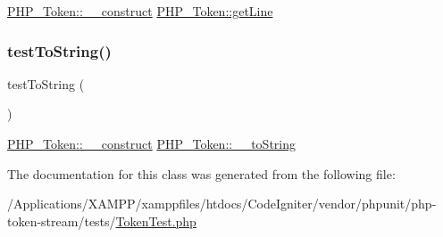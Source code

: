 \mbox{\hyperlink{class_p_h_p___token_a964082b4a027ef6b5e11976d90cf21b6}{P\+H\+P\+\_\+\+Token\+::\+\_\+\+\_\+construct}}  \mbox{\hyperlink{class_p_h_p___token_aef9c32f6066788a101028a1d4150f8cb}{P\+H\+P\+\_\+\+Token\+::get\+Line}} \mbox{\label{class_p_h_p___token_test_ad0c45cf7077d1d6d8627e47de00e0374}} 
\subsubsection{\texorpdfstring{test\+To\+String()}{testToString()}}
{\footnotesize\ttfamily test\+To\+String (\begin{DoxyParamCaption}{ }\end{DoxyParamCaption})}

\mbox{\hyperlink{class_p_h_p___token_a964082b4a027ef6b5e11976d90cf21b6}{P\+H\+P\+\_\+\+Token\+::\+\_\+\+\_\+construct}}  \mbox{\hyperlink{class_p_h_p___token_a7516ca30af0db3cdbf9a7739b48ce91d}{P\+H\+P\+\_\+\+Token\+::\+\_\+\+\_\+to\+String}} 

The documentation for this class was generated from the following file\+:\begin{DoxyCompactItemize}
\item 
/\+Applications/\+X\+A\+M\+P\+P/xamppfiles/htdocs/\+Code\+Igniter/vendor/phpunit/php-\/token-\/stream/tests/\mbox{\hyperlink{_token_test_8php}{Token\+Test.\+php}}\end{DoxyCompactItemize}
